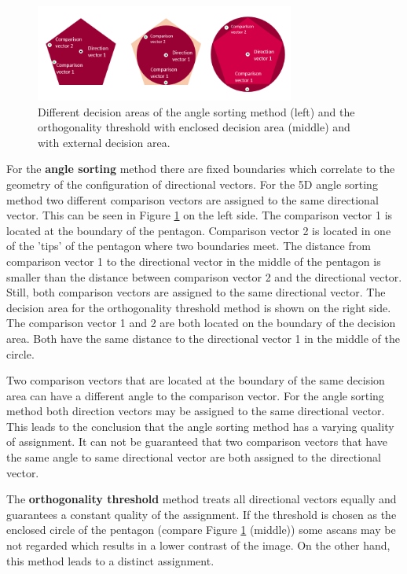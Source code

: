 \begin{figure}[H]
    \centering
    \includegraphics[width=0.76\textwidth]{Graphics/different_quality_assignment.png}
    \caption{Different decision areas of the angle sorting method (left) and the orthogonality threshold with enclosed decision area (middle) and with external decision area. }
    \label{angle_assignment_quality}
\end{figure}

For the \textbf{angle sorting} method there are fixed boundaries which correlate to the geometry of the configuration of directional vectors. For the 5D angle sorting method two different comparison vectors are assigned to the same directional vector. This can be seen in Figure \ref{angle_assignment_quality} on the left side. The comparison vector 1 is located at the boundary of the pentagon. Comparison vector 2 is located in one of the 'tips' of the pentagon where two boundaries meet. The distance from comparison vector 1 to the directional vector in the middle of the pentagon is smaller than the distance between comparison vector 2 and the directional vector. Still, both comparison vectors are assigned to the same directional vector. 
The decision area for the orthogonality threshold method is shown on the right side. The comparison vector 1 and 2 are both located on the boundary of the decision area. Both have the same distance to the directional vector 1 in the middle of the circle. 

Two comparison vectors that are located at the boundary of the same decision area can have a different angle to the comparison vector. For the angle sorting method both direction vectors may be assigned to the same directional vector. This leads to the conclusion that the angle sorting method has a varying quality of assignment. It can not be guaranteed that two comparison vectors that have the same angle to same directional vector are both assigned to the directional vector. 

\bigskip


The \textbf{orthogonality threshold} method treats all directional vectors equally and guarantees a constant quality of the assignment. If the threshold is chosen as the enclosed circle of the pentagon (compare Figure \ref{angle_assignment_quality} (middle)) some \acp{ascan} may be not regarded which results in a lower contrast of the image. On the other hand, this method leads to a distinct assignment.

